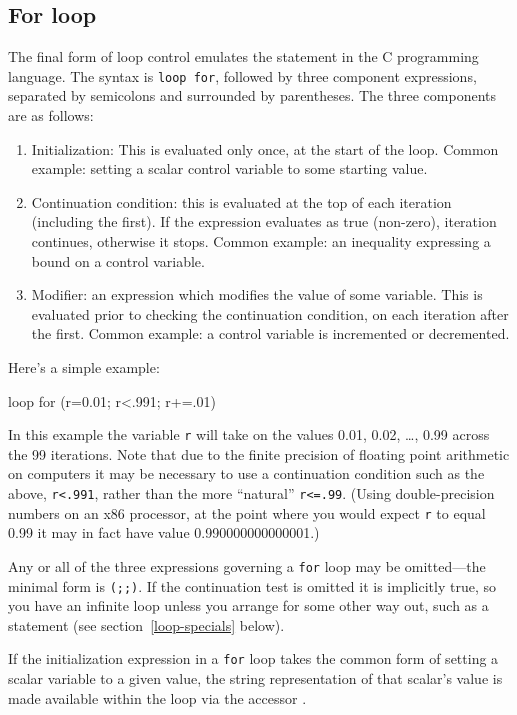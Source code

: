 \subsection{For loop}
\label{loop-for}

The final form of loop control emulates the  statement in the
C programming language.  The syntax is \texttt{loop for}, followed by
three component expressions, separated by semicolons and surrounded by
parentheses.  The three components are as follows:

\begin{enumerate}
\item Initialization: This is evaluated only once, at the start of the
  loop.  Common example: setting a scalar control variable to some
  starting value.
\item Continuation condition: this is evaluated at the top of each
  iteration (including the first).  If the expression evaluates as
  true (non-zero), iteration continues, otherwise it stops. Common
  example: an inequality expressing a bound on a control variable.
\item Modifier: an expression which modifies the value of
  some variable.  This is evaluated prior to checking the
  continuation condition, on each iteration after the first.
  Common example: a control variable is incremented or
  decremented.
\end{enumerate}

Here's a simple example:
%
\begin{code}
loop for (r=0.01; r<.991; r+=.01)
\end{code}

In this example the variable \verb+r+ will take on the values 0.01,
0.02, \dots{}, 0.99 across the 99 iterations.  Note that due to the
finite precision of floating point arithmetic on computers it may be
necessary to use a continuation condition such as the above,
\verb+r<.991+, rather than the more ``natural'' \verb+r<=.99+.  (Using
double-precision numbers on an x86 processor, at the point where you
would expect \verb+r+ to equal 0.99 it may in fact have value
0.990000000000001.)

Any or all of the three expressions governing a \texttt{for} loop may
be omitted---the minimal form is \texttt{(;;)}.  If the continuation
test is omitted it is implicitly true, so you have an infinite loop
unless you arrange for some other way out, such as a 
statement (see section~\ref{loop-specials} below).

If the initialization expression in a \texttt{for} loop takes the
common form of setting a scalar variable to a given value, the string
representation of that scalar's value is made available within
the loop via the accessor .

